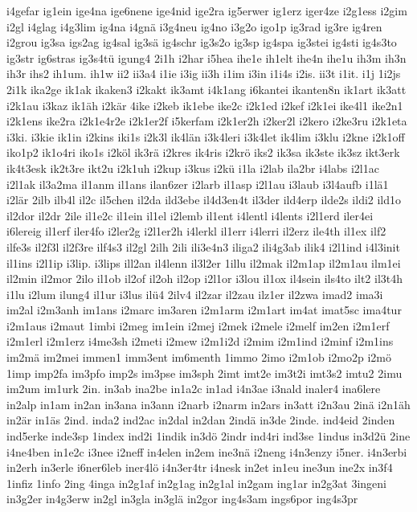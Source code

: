 {i4gefar
ig1ein
ige4na
ige6nene
ige4nid
ige2ra
ig5erwer
ig1erz
iger4ze
i2g1ess
i2gim
i2gl
i4glag
i4g3lim
ig4na
i4gnä
i3g4neu
ig4no
i3g2o
igo1p
ig3rad
ig3re
ig4ren
i2grou
ig3sa
igs2ag
ig4sal
ig3sä
ig4schr
ig3s2o
ig3sp
ig4spa
ig3stei
ig4sti
ig4s3to
ig3str
ig6stras
ig3s4tü
igung4
2i1h
i2har
i5hea
ihe1e
ih1elt
ihe4n
ihe1u
ih3m
ih3n
ih3r
ihs2
ih1um.
ih1w
ii2
ii3a4
i1ie
i3ig
ii3h
i1im
i3in
i1i4s
i2is.
ii3t
i1it.
i1j
1i2js
2i1k
ika2ge
ik1ak
ikaken3
i2kakt
ik3amt
i4k1ang
i6kantei
ikanten8n
ik1art
ik3att
i2k1au
i3kaz
ik1äh
i2kär
4ike
i2keb
ik1ebe
ike2c
i2k1ed
i2kef
i2k1ei
ike4l1
ike2n1
i2k1ens
ike2ra
i2k1e4r2e
i2k1er2f
i5kerfam
i2k1er2h
i2ker2l
i2kero
i2ke3ru
i2k1eta
i3ki.
i3kie
ik1in
i2kins
iki1s
i2k3l
ik4län
i3k4leri
i3k4let
ik4lim
i3klu
i2kne
i2k1off
iko1p2
ik1o4ri
iko1s
i2köl
ik3rä
i2kres
ik4ris
i2krö
iks2
ik3sa
ik3ste
ik3sz
ikt3erk
ik4t3esk
ik2t3re
ikt2u
i2k1uh
i2kup
i3kus
i2kü
i1la
i2lab
ila2br
i4labs
i2l1ac
i2l1ak
il3a2ma
il1anm
il1ans
ilan6zer
i2larb
il1asp
i2l1au
i3laub
i3l4aufb
i1lä1
i2lär
2ilb
ilb4l
il2c
il5chen
il2da
ild3ebe
il4d3en4t
il3der
ild4erp
ilde2s
ildi2
ild1o
il2dor
il2dr
2ile
il1e2c
il1ein
il1el
i2lemb
il1ent
i4lentl
i4lents
i2l1erd
iler4ei
i6lereig
il1erf
iler4fo
i2ler2g
i2l1er2h
i4lerkl
il1err
i4lerri
il2erz
ile4th
il1ex
ilf2
ilfe3s
il2f3l
il2f3re
ilf4s3
il2gl
2ilh
2ili
ili3e4n3
iliga2
ili4g3ab
ilik4
i2l1ind
i4l3init
il1ins
i2l1ip
i3lip.
i3lips
ill2an
il4lenn
il3l2er
1illu
il2mak
il2m1ap
il2m1au
ilm1ei
il2min
il2mor
2ilo
il1ob
il2of
il2oh
il2op
i2l1or
i3lou
il1ox
il4sein
ils4to
ilt2
il3t4h
i1lu
i2lum
ilung4
il1ur
i3lus
ilü4
2ilv4
il2zar
il2zau
ilz1er
il2zwa
imad2
ima3i
im2al
i2m3anh
im1ans
i2marc
im3aren
i2m1arm
i2m1art
im4at
imat5sc
ima4tur
i2m1aus
i2maut
1imbi
i2meg
im1ein
i2mej
i2mek
i2mele
i2melf
im2en
i2m1erf
i2m1erl
i2m1erz
i4me3sh
i2meti
i2mew
i2m1i2d
i2mim
i2m1ind
i2minf
i2m1ins
im2mä
im2mei
immen1
imm3ent
im6menth
1immo
2imo
i2m1ob
i2mo2p
i2mö
1imp
imp2fa
im3pfo
imp2s
im3pse
im3sph
2imt
imt2e
im3t2i
imt3s2
imtu2
2imu
im2um
im1urk
2in.
in3ab
ina2be
in1a2c
in1ad
i4n3ae
i3nald
inaler4
ina6lere
in2alp
in1am
in2an
in3ana
in3ann
i2narb
i2narm
in2ars
in3att
i2n3au
2inä
i2n1äh
in2är
in1äs
2ind.
inda2
ind2ac
in2dal
in2dan
2indä
in3de
2inde.
ind4eid
2inden
ind5erke
inde3sp
1index
ind2i
1indik
in3dö
2indr
ind4ri
ind3se
1indus
in3d2ü
2ine
i4ne4ben
in1e2c
i3nee
i2neff
in4elen
in2em
ine3nä
i2neng
i4n3enzy
i5ner.
i4n3erbi
in2erh
in3erle
i6ner6leb
iner4lö
i4n3er4tr
i4nesk
in2et
in1eu
ine3un
ine2x
in3f4
1infiz
1info
2ing
4inga
in2g1af
in2g1ag
in2g1al
in2gam
ing1ar
in2g3at
3ingeni
in3g2er
in4g3erw
in2gl
in3gla
in3glä
in2gor
ing4s3am
ings6por
ing4s3pr
}
